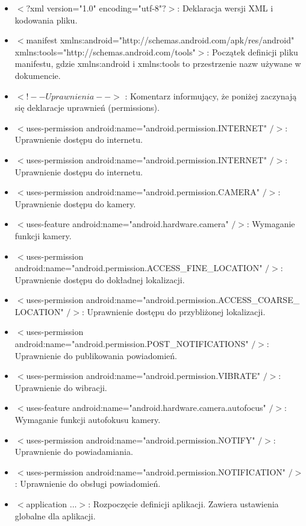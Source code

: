\begin{itemize}
    \item \(<?\)xml version="1.0" encoding="utf-8"\(?>\): Deklaracja wersji XML i kodowania pliku.
    \item \(<\)manifest xmlns:android="http://schemas.android.com/apk/res/android"\\xmlns:tools="http://schemas.android.com/tools"\(>\): Początek definicji pliku manifestu, gdzie xmlns:android i xmlns:tools to przestrzenie nazw używane w dokumencie.
    \item \(<!-- Uprawnienia -->\) : Komentarz informujący, że poniżej zaczynają się deklaracje uprawnień (permissions).
    \item \(<\)uses-permission android:name="android.permission.INTERNET" \(/>\): Uprawnienie dostępu do internetu.
    \item \(<\)uses-permission android:name="android.permission.INTERNET" \(/>\): Uprawnienie dostępu do internetu.
    \item \(<\)uses-permission android:name="android.permission.CAMERA" \(/>\): Uprawnienie dostępu do kamery.
    \item \(<\)uses-feature android:name="android.hardware.camera" \(/>\): Wymaganie funkcji kamery.
    \item \(<\)uses-permission android:name="android.permission.ACCESS\_FINE\_LOCATION" \(/>\): Uprawnienie dostępu do dokładnej lokalizacji.
    \item \(<\)uses-permission android:name="android.permission.ACCESS\_COARSE\_\\LOCATION" \(/>\): Uprawnienie dostępu do przybliżonej lokalizacji.
    \item \(<\)uses-permission android:name="android.permission.POST\_NOTIFICATIONS" \(/>\): Uprawnienie do publikowania powiadomień.
    \item \(<\)uses-permission android:name="android.permission.VIBRATE" \(/>\): Uprawnienie do wibracji.
    \item \(<\)uses-feature android:name="android.hardware.camera.autofocus" \(/>\): Wymaganie funkcji autofokusu kamery.
    \item \(<\)uses-permission android:name="android.permission.NOTIFY" \(/>\): Uprawnienie do powiadamiania.
    \item \(<\)uses-permission android:name="android.permission.NOTIFICATION" \(/>\): Uprawnienie do obsługi powiadomień.
    \item \(<\)application ...\(>\): Rozpoczęcie definicji aplikacji. Zawiera ustawienia globalne dla aplikacji.

\end{itemize}
